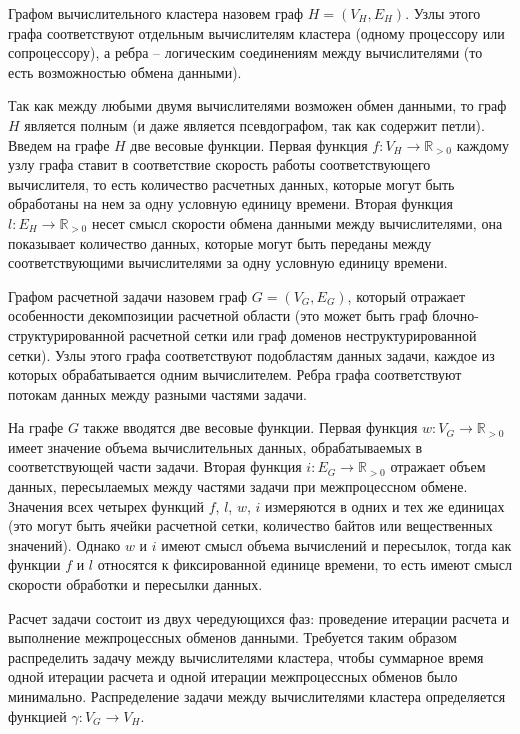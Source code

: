 \begin{definition}
Графом вычислительного кластера назовем граф $H = (V_H, E_H)$.
Узлы этого графа соответствуют отдельным вычислителям кластера (одному процессору или сопроцессору), а ребра -- логическим соединениям между вычислителями (то есть возможностью обмена данными).
\end{definition}

Так как между любыми двумя вычислителями возможен обмен данными, то граф $H$ является полным (и даже является псевдографом, так как содержит петли).
Введем на графе $H$ две весовые функции.
Первая функция $f: V_H \rightarrow \mathbb{R}_{> 0}$ каждому узлу графа ставит в соответствие скорость работы соответствующего вычислителя, то есть количество расчетных данных, которые могут быть обработаны на нем за одну условную единицу времени.
Вторая функция $l: E_H \rightarrow \mathbb{R}_{> 0}$ несет смысл скорости обмена данными между вычислителями, она показывает количество данных, которые могут быть переданы между соответствующими вычислителями за одну условную единицу времени.

\begin{definition}
Графом расчетной задачи назовем граф $G = (V_G, E_G)$, который отражает особенности декомпозиции расчетной области (это может быть граф блочно-структурированной расчетной сетки или граф доменов неструктурированной сетки).
Узлы этого графа соответствуют подобластям данных задачи, каждое из которых обрабатывается одним вычислителем.
Ребра графа соответствуют потокам данных между разными частями задачи.
\end{definition}

На графе $G$ также вводятся две весовые функции.
Первая функция $w: V_G \rightarrow \mathbb{R}_{> 0}$ имеет значение объема вычислительных данных, обрабатываемых в соответствующей части задачи.
Вторая функция $i: E_G \rightarrow \mathbb{R}_{> 0}$ отражает объем данных, пересылаемых между частями задачи при межпроцессном обмене.
Значения всех четырех функций $f$, $l$, $w$, $i$ измеряются в одних и тех же единицах (это могут быть ячейки расчетной сетки, количество байтов или вещественных значений).
Однако $w$ и $i$ имеют смысл объема вычислений и пересылок, тогда как функции $f$ и $l$ относятся к фиксированной единице времени, то есть имеют смысл скорости обработки и пересылки данных.

Расчет задачи состоит из двух чередующихся фаз: проведение итерации расчета и выполнение межпроцессных обменов данными.
Требуется таким образом распределить задачу между вычислителями кластера, чтобы суммарное время одной итерации расчета и одной итерации межпроцессных обменов было минимально.
Распределение задачи между вычислителями кластера определяется функцией $\gamma: V_G \rightarrow V_H$.


